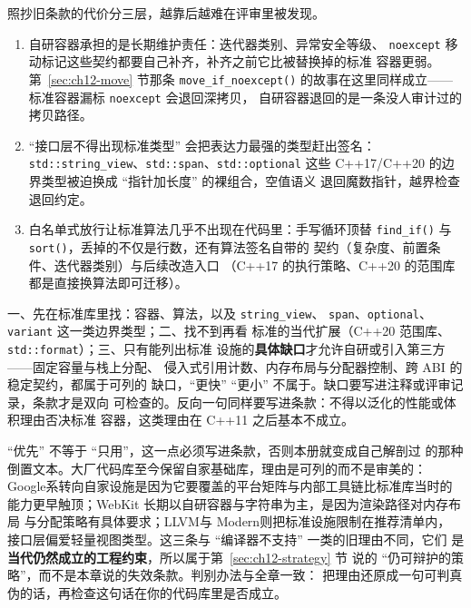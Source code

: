 \documentclass[12pt,a4paper,fontset=fandol]{ctexbook}
\newcommand{\cpp}[1]{C++#1}
\newcommand{\Fn}[1]{\texttt{#1()}}
\newcommand{\Tp}[1]{\texttt{#1}}
\newcommand{\Bk}{\discretionary{}{}{}}
\newcommand{\Lang}[1]{\textsf{#1}}
\newcommand{\DomGo}{\Lang{Google}}
\newcommand{\DomLlvm}{\Lang{LLVM}}
\newcommand{\DomMod}{\Lang{Modern}}
\begin{document}
照抄旧条款的代价分三层，越靠后越难在评审里被发现。

\begin{enumerate}[label=（\arabic*）]
\item 自研容器承担的是长期维护责任：迭代器类别、异常安全等级、
  \Tp{noexcept} 移动标记这些契约都要自己补齐，补齐之前它比被替换掉的标准
  容器更弱。第~\ref{sec:ch12-move} 节那条 \Fn{move{\Bk}\_if{\Bk}\_noexcept}
  的故事在这里同样成立——标准容器漏标 \Tp{noexcept} 会退回深拷贝，
  自研容器退回的是一条没人审计过的拷贝路径。
\item ``接口层不得出现标准类型'' 会把表达力最强的类型赶出签名：
  \Tp{std::string{\Bk}\_view}、\Tp{std::span}、\Tp{std::optional} 这些
  \cpp{17}/{\Bk}\cpp{20} 的边界类型被迫换成 ``指针加长度'' 的裸组合，空值语义
  退回魔数指针，越界检查退回约定。
\item 白名单式放行让标准算法几乎不出现在代码里：手写循环顶替
  \Fn{find{\Bk}\_if} 与 \Fn{sort}，丢掉的不仅是行数，还有算法签名自带的
  契约（复杂度、前置条件、迭代器类别）与后续改造入口
  （\cpp{17} 的执行策略、\cpp{20} 的范围库都是直接换算法即可迁移）。
\end{enumerate}

\begin{guideline}[title={标准库优先条款的三级写法}]
一、先在标准库里找：容器、算法，以及 \Tp{string{\Bk}\_view}、
\Tp{span}、\Tp{optional}、\Tp{variant} 这一类边界类型；二、找不到再看
标准的当代扩展（\cpp{20} 范围库、\Tp{std::format}）；三、只有能列出标准
设施的\textbf{具体缺口}才允许自研或引入第三方——固定容量与栈上分配、
侵入式引用计数、内存布局与分配器控制、跨 ABI 的稳定契约，都属于可列的
缺口，``更快'' ``更小'' 不属于。缺口要写进注释或评审记录，条款才是双向
可检查的。反向一句同样要写进条款：不得以泛化的性能或体积理由否决标准
容器，这类理由在 \cpp{11} 之后基本不成立。
\end{guideline}

``优先'' 不等于 ``只用''，这一点必须写进条款，否则本册就变成自己解剖过
的那种倒置文本。大厂代码库至今保留自家基础库，理由是可列的而不是审美的：
\DomGo 系转向自家设施是因为它要覆盖的平台矩阵与内部工具链比标准库当时的
能力更早触顶；WebKit 长期以自研容器与字符串为主，是因为渲染路径对内存布局
与分配策略有具体要求；\DomLlvm 与 \DomMod 则把标准设施限制在推荐清单内，
接口层偏爱轻量视图类型。这三条与 ``编译器不支持'' 一类的旧理由不同，它们
是\textbf{当代仍然成立的工程约束}，所以属于第~\ref{sec:ch12-strategy} 节
说的 ``仍可辩护的策略''，而不是本章说的失效条款。判别办法与全章一致：
把理由还原成一句可判真伪的话，再检查这句话在你的代码库里是否成立。
\end{document}
